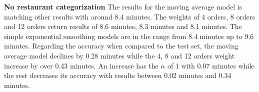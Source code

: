 \begin{table}[h]
\centering
\caption{Weekday categorization with slot}
\label{Weekday and slot categorization results}
\end{table}
\newline\newline\textbf{No restaurant categorization}\newline
The results for the moving average model is matching other results with around 8.4 minutes. The weights of 4 orders, 8 orders and 12 orders return results of 8.6 minutes, 8.3 minutes and 8.1 minutes. The simple exponential smoothing models are in the range from 8.4 minutes up to 9.6 minutes. Regarding the accuracy when compared to the test set, the moving average model declines by 0.28 minutes while the 4, 8 and 12 orders weight increase by over 0.43 minutes. An increase has the $\alpha$ of 1 with 0.07 minutes while the rest decreases its accuracy with results between 0.02 minutes and 0.34 minutes.\newline
